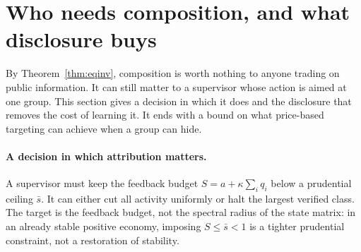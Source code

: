 \section{Who needs composition, and what disclosure buys}\label{sec:supervision}

By Theorem~\ref{thm:eqinv}, composition is worth nothing to anyone trading on public information. It can still matter to a supervisor whose action is aimed at one group. This section gives a decision in which it does and the disclosure that removes the cost of learning it. It ends with a bound on what price-based targeting can achieve when a group can hide.

\paragraph{A decision in which attribution matters.} A supervisor must keep the feedback budget $S=a+\kappa\sum_iq_i$ below a prudential ceiling $\bar s$. It can either cut all activity uniformly or halt the largest verified class. The target is the feedback budget, not the spectral radius of the state matrix: in an already stable positive economy, imposing $S\le\bar s<1$ is a tighter prudential constraint, not a restoration of stability.

